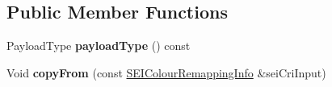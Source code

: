 \subsection*{Public Member Functions}
\begin{DoxyCompactItemize}
\item 
\mbox{\label{class_s_e_i_colour_remapping_info_a21807fc4e0b3fe9c7e640f789d8b4dec}} 
Payload\+Type {\bfseries payload\+Type} () const
\item 
\mbox{\label{class_s_e_i_colour_remapping_info_a4346d6028da74fcc821a7d9b2d02c71d}} 
Void {\bfseries copy\+From} (const \hyperlink{class_s_e_i_colour_remapping_info}{S\+E\+I\+Colour\+Remapping\+Info} \&sei\+Cri\+Input)
\end{DoxyCompactItemize}
